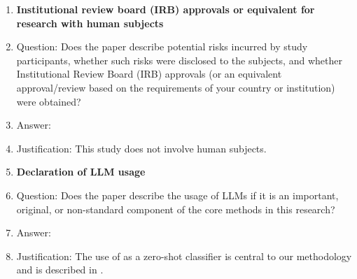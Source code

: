 \begin{enumerate}
\item {\bf Institutional review board (IRB) approvals or equivalent for research with human subjects}
    \item[] Question: Does the paper describe potential risks incurred by study participants, whether such risks were disclosed to the subjects, and whether Institutional Review Board (IRB) approvals (or an equivalent approval/review based on the requirements of your country or institution) were obtained?
    \item[] Answer: \answerNA{}
    \item[] Justification: This study does not involve human subjects.

\item {\bf Declaration of LLM usage}
    \item[] Question: Does the paper describe the usage of LLMs if it is an important, original, or non-standard component of the core methods in this research?
    \item[] Answer: \answerYes{}
    \item[] Justification: The use of \gptmini as a zero-shot classifier is central to our methodology and is described in .

\end{enumerate}

